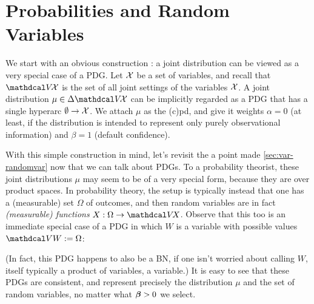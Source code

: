 \section{Probabilities and Random Variables}
    \label{sec:prob-as-pdg}


We start with an obvious construction
\unskip: a joint distribution can be viewed as a very special case of a PDG. 
Let $\mathcal X$ be a set of variables, and recall that $\V\!\X$ is the set of all joint settings of the variables $\mathcal X$. 
A joint distribution $\mu \in \Delta \V\!\X$ can be implicitly regarded as a PDG that has a single hyperarc $\emptyset \to \mathcal X$.
We attach $\mu$ as the (c)pd, and give it weights $\alpha=0$
%
(at least, if the distribution is intended to represent only purely observational information) and 
$\beta = 1$ (default confidence). 

With this simple construction in mind,  
    let's revisit the a point made \cref{sec:var-randomvar}
    now that we can talk about PDGs. 
To a probability theorist, these joint distributions $\mu$ may seem to be of a very special form, because they are over product spaces. 
In probability theory, the setup is typically instead that one has a (measurable) set $\Omega$ of outcomes, and then random variables are in fact \emph{(measurable) functions} $X : \Omega \to \V\!X$. 
Observe that this too is an immediate special case of a PDG
in which $W$ is a variable with possible values $\V W := \Omega$:
%
\begin{center}
\end{center}
%
(In fact, this PDG happens to also be a BN, if one isn't worried about calling $W$, itself typically a product of variables, a variable.)
It is easy to see that these PDGs are consistent, and represent precisely the distribution $\mu$ and the set of random variables, no matter what $\boldsymbol\beta > 0$ we select.


